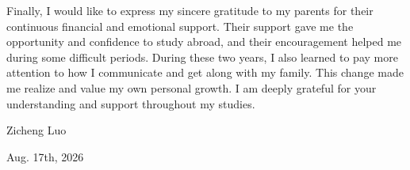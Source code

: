 Finally, I would like to express my sincere gratitude to my parents for their continuous financial and emotional support. Their support gave me the opportunity and confidence to study abroad, and their encouragement helped me during some difficult periods. During these two years, I also learned to pay more attention to how I communicate and get along with my family. This change made me realize and value my own personal growth. I am deeply grateful for your understanding and support throughout my studies.


\begin{flushright}
Zicheng Luo

Aug. 17th, 2026
\end{flushright}